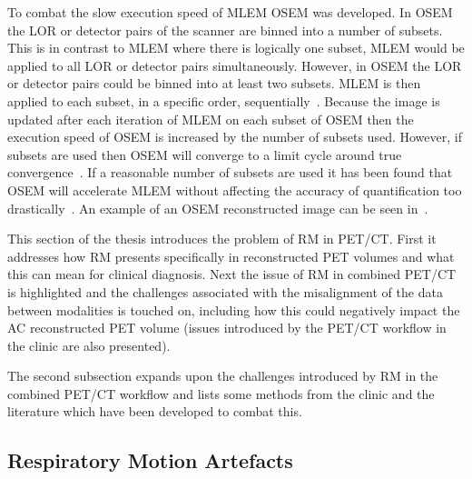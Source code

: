             To combat the slow execution speed of \gls{MLEM} \gls{OSEM} was developed. In \gls{OSEM} the \gls{LOR} or detector pairs of the scanner are binned into a number of subsets. This is in contrast to \gls{MLEM} where there is logically one subset, \gls{MLEM} would be applied to all \gls{LOR} or detector pairs simultaneously. However, in \gls{OSEM} the \gls{LOR} or detector pairs could be binned into at least two subsets. \gls{MLEM} is then applied to each subset, in a specific order, sequentially~\parencite{Hudson1994}. Because the image is updated after each iteration of \gls{MLEM} on each subset of \gls{OSEM} then the execution speed of \gls{OSEM} is increased by the number of subsets used. However, if%
            subsets are used %
            then  \gls{OSEM} will converge to a limit cycle around true convergence~\parencite{Mettivier2011}. If a reasonable number of subsets are used it has been found that \gls{OSEM} will accelerate \gls{MLEM} without affecting the accuracy of quantification too drastically~\parencite{Morey2013}. An example of an \gls{OSEM} reconstructed image can be seen in~.
            
        This section of the thesis introduces the problem of \gls{RM} in \gls{PET}/\gls{CT}. First it addresses how \gls{RM} presents specifically in reconstructed \gls{PET} volumes and what this can mean for clinical diagnosis. Next the issue of \gls{RM} in combined \gls{PET}/\gls{CT} is highlighted and the challenges associated with the misalignment of the data between modalities is touched on, including how this could negatively impact the \gls{AC} reconstructed \gls{PET} volume (issues introduced by the \gls{PET}/\gls{CT} workflow in the clinic are also presented).
            
        The second subsection expands upon the challenges introduced by \gls{RM} in the combined \gls{PET}/\gls{CT} workflow and lists some methods from the clinic and the literature which have been developed to combat this.
        
        \subsection{Respiratory Motion Artefacts} \label{sec:respiratory_motion_artefacts}
            
